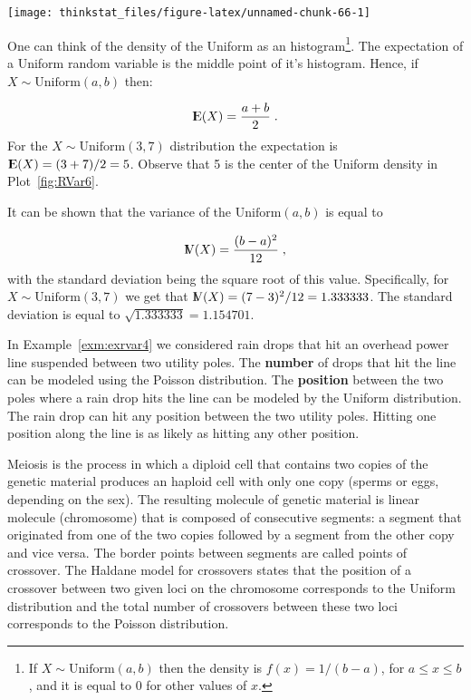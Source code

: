 \documentclass[]{krantz}
\newcommand{\Expec}{{\rm I\kern-.3em E}}
\newcommand{\Var}{{\rm I\kern-.3em V}}
\theoremstyle{definition}
\theoremstyle{definition}
\theoremstyle{definition}
\theoremstyle{remark}
\let\BeginKnitrBlock\begin \let\EndKnitrBlock\end
\begin{document}
\begin{center}\texttt{[image: thinkstat\_files/figure-latex/unnamed-chunk-66-1]} \end{center}

One can think of the density of the Uniform as an histogram\footnote{If
  \(X \sim \mathrm{Uniform}(a,b)\) then the density is
  \(f(x) = 1/(b-a)\), for \(a \leq x \leq b\), and it is equal to 0 for
  other values of \(x\).}. The expectation of a Uniform random variable
is the middle point of it's histogram. Hence, if
\(X \sim \mathrm{Uniform}(a,b)\) then:

\[\Expec(X) = \frac{a+b}{2}\;.\] For the
\(X \sim \mathrm{Uniform}(3,7)\) distribution the expectation is
\(\Expec(X)= (3+7)/2 = 5\). Observe that 5 is the center of the Uniform
density in Plot~\ref{fig:RVar6}.

It can be shown that the variance of the \(\mathrm{Uniform}(a,b)\) is
equal to

\[\Var(X) = \frac{(b-a)^2}{12}\;,\] with the standard deviation being
the square root of this value. Specifically, for
\(X \sim \mathrm{Uniform}(3,7)\) we get that
\(\Var(X) = (7-3)^2/12 = 1.333333\). The standard deviation is equal to
\(\sqrt{1.333333} = 1.154701\).

\BeginKnitrBlock{example}
\protect\hypertarget{exm:exrvar5}{}{\label{exm:exrvar5} }In
Example~\ref{exm:exrvar4} we considered rain drops that hit an overhead
power line suspended between two utility poles. The {\textbf{number}} of
drops that hit the line can be modeled using the Poisson distribution.
The {\textbf{position}} between the two poles where a rain drop hits the
line can be modeled by the Uniform distribution. The rain drop can hit
any position between the two utility poles. Hitting one position along
the line is as likely as hitting any other position.
\EndKnitrBlock{example}

\BeginKnitrBlock{example}
\protect\hypertarget{exm:exrvar6}{}{\label{exm:exrvar6} }Meiosis is the
process in which a diploid cell that contains two copies of the genetic
material produces an haploid cell with only one copy (sperms or eggs,
depending on the sex). The resulting molecule of genetic material is
linear molecule (chromosome) that is composed of consecutive segments: a
segment that originated from one of the two copies followed by a segment
from the other copy and vice versa. The border points between segments
are called points of crossover. The Haldane model for crossovers states
that the position of a crossover between two given loci on the
chromosome corresponds to the Uniform distribution and the total number
of crossovers between these two loci corresponds to the Poisson
distribution.
\EndKnitrBlock{example}
\end{document}
